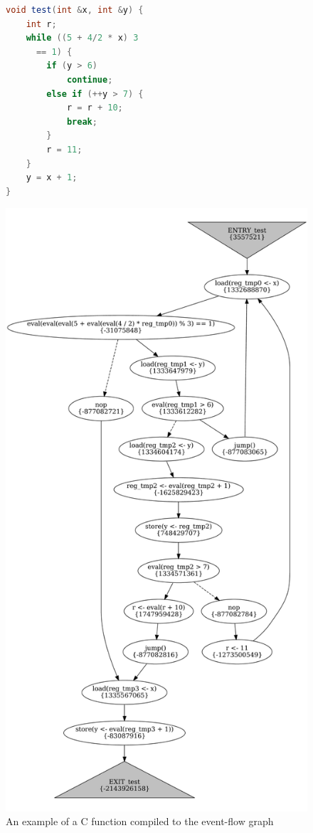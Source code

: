 \begin{figure}[!h]
\begin{minipage}{.4\textwidth}
\begin{lstlisting}[language=Java,basicstyle=\ttfamily\small]
void test(int &x, int &y) {
    int r;
    while ((5 + 4/2 * x) 3 
      == 1) {
        if (y > 6)
            continue;
        else if (++y > 7) {
            r = r + 10;
            break;
        }
        r = 11;
    }
    y = x + 1;
}
\end{lstlisting}
\end{minipage}
%
\begin{minipage}{.59\textwidth}
  \includegraphics[width=\textwidth,keepaspectratio]{img/my/graphs/test.png}
\end{minipage}
%
\caption{An example of a C function compiled to the event-flow graph}
\label{ex:compilation}
\end{figure}

